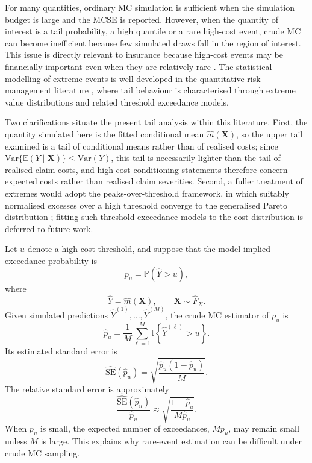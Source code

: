 \noindent
For many quantities, ordinary MC simulation is sufficient when the
simulation budget is large and the MCSE is reported.
However, when the quantity of interest is a tail probability, a high quantile or
a rare high-cost event, crude MC can become inefficient because few
simulated draws fall in the region of interest. This issue is directly relevant
to insurance because high-cost events may be financially important even when
they are relatively rare \citep{glasserman2004monte}.  The statistical
modelling of extreme events is well developed in the quantitative risk
management literature \citep{mcneil2015quantitative, embrechts1997modelling,
coles2001introduction}, where tail behaviour is characterised through extreme
value distributions and related threshold exceedance models.

\noindent
Two clarifications situate the present tail analysis within this
literature. First, the quantity simulated here is the fitted conditional
mean \(\widehat{m}(\mathbf{X})\), so the upper tail examined is a tail of
conditional means rather than of realised costs; since
\(\mathrm{Var}\{\mathbb{E}(Y\mid\mathbf{X})\}\leq\mathrm{Var}(Y)\), this
tail is necessarily lighter than the tail of realised claim costs, and
high-cost conditioning statements therefore concern expected costs rather
than realised claim severities. Second, a fuller treatment of extremes
would adopt the peaks-over-threshold framework, in which suitably
normalised excesses over a high threshold converge to the generalised
Pareto distribution
\citep{pickands1975statistical, balkema1974residual, coles2001introduction};
fitting such threshold-exceedance models to the cost distribution is
deferred to future work.

\noindent
Let \(u\) denote a high-cost threshold, and suppose that the model-implied
exceedance probability is
\[
    p_u
    =
    \mathbb{P}
    \!\left(
        \widehat{Y}>u
    \right),
\]
where
\[
    \widehat{Y}
    =
    \widehat{m}(\mathbf{X}),
    \qquad
    \mathbf{X}
    \sim
    \widehat{F}_{X}.
\]
Given simulated predictions
\(\widehat{Y}^{(1)},\ldots,\widehat{Y}^{(M)}\), the crude MC estimator
of \(p_u\) is
\[
    \widehat{p}_u
    =
    \frac{1}{M}
    \sum_{\ell=1}^{M}
    \mathbb{I}
    \!\left\{
        \widehat{Y}^{(\ell)}>u
    \right\}.
\]
Its estimated standard error is
\[
    \widehat{\mathrm{SE}}
    \!\left(
        \widehat{p}_u
    \right)
    =
    \sqrt{
        \frac{
            \widehat{p}_u
            \left(
                1-\widehat{p}_u
            \right)
        }{
            M
        }
    }.
\]
The relative standard error is approximately
\[
    \frac{
        \widehat{\mathrm{SE}}
        \!\left(
            \widehat{p}_u
        \right)
    }{
        \widehat{p}_u
    }
    \approx
    \sqrt{
        \frac{
            1-\widehat{p}_u
        }{
            M\widehat{p}_u
        }
    }.
\]
When \(p_u\) is small, the expected number of exceedances,
\(Mp_u\), may remain small unless \(M\) is large. This explains why rare-event
estimation can be difficult under crude MC sampling.

